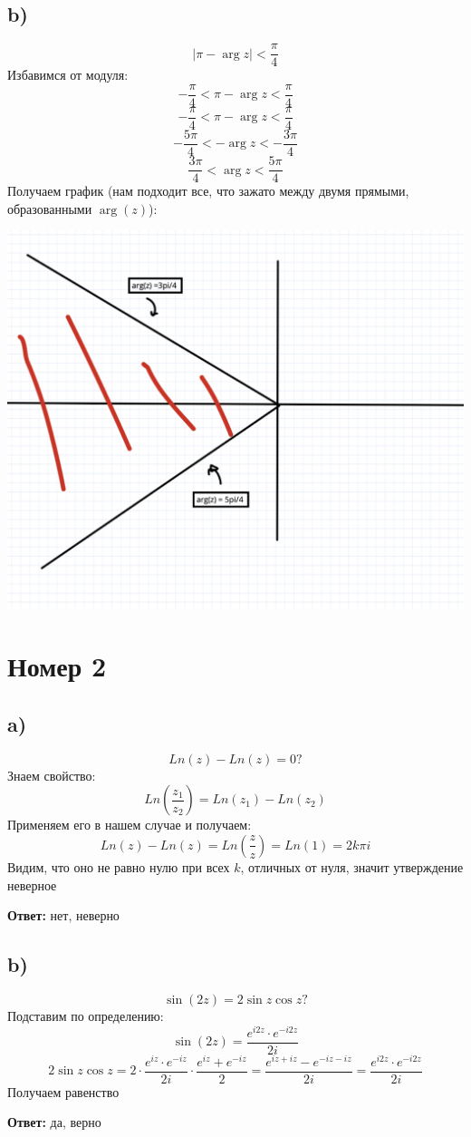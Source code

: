 \documentclass[a4paper,12pt]{article}
\begin{document}
\subsection*{b)}
\[
|\pi - \arg z | < \frac{\pi}{4}
\]
Избавимся от модуля:
\[
- \frac{\pi}{4} < \pi - \arg z  < \frac{\pi}{4}
\]
\[
- \frac{\pi}{4} < \pi - \arg z  < \frac{\pi}{4}
\]
\[
- \frac{5\pi}{4} < - \arg z  < -\frac{3\pi}{4}
\]
\[
\frac{3\pi}{4} <  \arg z  < \frac{5\pi}{4}
\]
Получаем график (нам подходит все, что зажато между двумя прямыми, образованными $\arg(z)$):
\begin{center}
\includegraphics[scale=0.3]{2.png}
\end{center}
\clearpage
\section*{Номер 2}
\subsection*{a)}
\[
Ln (z) - Ln(z) = 0 ?
\]
Знаем свойство:
\[
Ln \left(\frac{z_1}{z_2}\right) = Ln(z_1) - Ln(z_2) 
\]
Применяем его в нашем случае и получаем:
\[
Ln (z) - Ln(z)  = Ln \left(\frac{z}{z}\right) = Ln(1) = 2k \pi i 
\]
Видим, что оно не равно нулю при всех $k$, отличных от нуля, значит утверждение неверное
\begin{center}
\textbf{Ответ: } нет, неверно  
\end{center}
\subsection*{b)}
\[
\sin (2z) = 2 \sin z \cos z ?
\]
Подставим по определению:
\[
\sin (2z) = \frac{e^{i2z} \cdot e^{-i2z}}{2i}
\]
\[
2 \sin z \cos z  = 2 \cdot \frac{e^{iz} \cdot e^{-iz}}{2i} \cdot \frac{e^{iz} +  e^{-iz}}{2} =  \frac{e^{iz + iz} - e^{-iz - iz}}{2i} = \frac{e^{i2z} \cdot e^{-i2z}}{2i}
\]
Получаем равенство
\begin{center}
\textbf{Ответ: } да, верно
\end{center}
\clearpage
\end{document}

